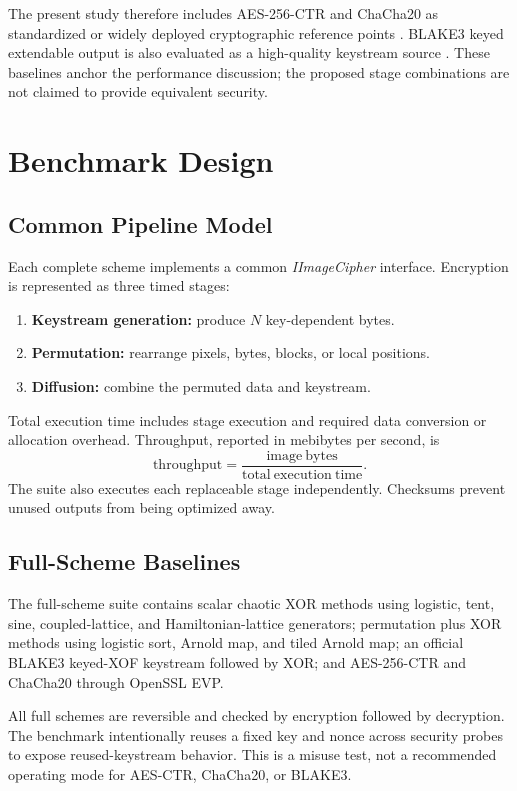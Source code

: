 \documentclass[twocolumn,runningheads]{svjour3}
\begin{document}
The present study therefore includes AES-256-CTR and ChaCha20 as standardized
or widely deployed cryptographic reference points \cite{nist2023,rfc8439}.
BLAKE3 keyed extendable output is also evaluated as a high-quality keystream
source \cite{blake3}. These baselines anchor the performance discussion; the
proposed stage combinations are not claimed to provide equivalent security.

\section{Benchmark Design}
\label{sec:design}

\subsection{Common Pipeline Model}
Each complete scheme implements a common \emph{IImageCipher} interface.
Encryption is represented as three timed stages:
\begin{enumerate}
\item \textbf{Keystream generation:} produce $N$ key-dependent bytes.
\item \textbf{Permutation:} rearrange pixels, bytes, blocks, or local
positions.
\item \textbf{Diffusion:} combine the permuted data and keystream.
\end{enumerate}
Total execution time includes stage execution and required data conversion or
allocation overhead. Throughput, reported in mebibytes per second, is
\begin{equation}
\mathrm{throughput} =
\frac{\mathrm{image\ bytes}}{\mathrm{total\ execution\ time}}.
\label{eq:throughput}
\end{equation}
The suite also executes each replaceable stage independently. Checksums
prevent unused outputs from being optimized away.

\subsection{Full-Scheme Baselines}
The full-scheme suite contains scalar chaotic XOR methods using logistic,
tent, sine, coupled-lattice, and Hamiltonian-lattice generators; permutation
plus XOR methods using logistic sort, Arnold map, and tiled Arnold map; an
official BLAKE3 keyed-XOF keystream followed by XOR; and AES-256-CTR and
ChaCha20 through OpenSSL EVP.

All full schemes are reversible and checked by encryption followed by
decryption. The benchmark intentionally reuses a fixed key and nonce across
security probes to expose reused-keystream behavior. This is a misuse test,
not a recommended operating mode for AES-CTR, ChaCha20, or BLAKE3.
\end{document}
